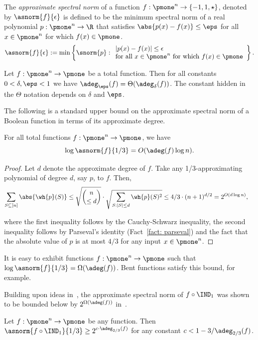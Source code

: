 \begin{definition}\label{defn: awt}
The \emph{approximate spectral norm} of a function  $f : \pmone^n \to \{-1,1,\star\}$, denoted by $\asnorm{f}{\epsilon}$ is defined to be the minimum spectral norm of a real polynomial $p : \pmone^n \to \R$ that satisfies $\abs{p(x) - f(x)} \leq \eps$ for all $x \in \pmone^n$ for which $f(x) \in \pmone$.
\[
\asnorm{f}{\epsilon}:=\min\left\{\snorm{p}:\begin{array}{l}|p(x)-f(x)|\leq\epsilon\\\text{for all }x\in\pmone^n\text{ for which }f(x)\in\pmone\end{array}\right\}.
\]
\end{definition}
\begin{lemma}\label{lem: asnormequiv} 
Let $f:\pmone^n \to \pmone$ be a total function. Then for all constants $0 < \delta, \eps < 1$ we have $\adeg_\eps(f) = \Theta(\adeg_\delta(f))$. The constant hidden in the $\Theta$ notation depends on $\delta$ and $\eps$.
\end{lemma}

The following is a standard upper bound on the approximate spectral norm of a Boolean function in terms of its approximate degree.
\begin{claim}\label{claim: adegnaivelb}
For all total functions $f : \pmone^n \to \pmone$, we have 
\[
\log \asnorm{f}{1/3} = O(\adeg(f) \log n).
\]
\end{claim}
\begin{proof}
Let $d$ denote the approximate degree of $f$.  Take any 1/3-approximating polynomial of degree $d$, say $p$, to $f$.  Then,
\begin{align*}
    \sum_{S \subseteq [n]} \abs{\wh{p}(S)} & \leq \sqrt{\binom{n}{\leq d}} \cdot \sqrt{\sum_{S: |S| \leq d}\wh{p}(S)^2} \leq 4/3 \cdot (n+1)^{d/2} = 2^{O(d \log n)},
\end{align*}

where the first inequality follows by the Cauchy-Schwarz inequality, the second inequality follows by Parseval's identity (Fact~\ref{fact: parseval}) and the fact that the absolute value of $p$ is at most $4/3$ for any input $x \in \pmone^n$.
\end{proof}

It is easy to exhibit functions $f : \pmone^n \to \pmone$ such that $\log \asnorm{f}{1/3} = \Omega(\adeg(f))$.  Bent functions satisfy this bound, for example.

Building upon ideas in~\cite{KP97}, the approximate spectral norm of $f \circ \IND_1$ was shown to be bounded below by $2^{\Omega(\adeg(f))}$ in~\cite{CM17}.
\begin{theorem}[\cite{CM17}]
Let $f:\pmone^n \rightarrow \pmone$ be any function. Then $\asnorm{f\circ\IND_1}{1/3} \geq 2^{c \cdot \adeg_{2/3}(f)}$ for any constant $c < 1 - 3/\adeg_{2/3}(f)$.
\end{theorem}


